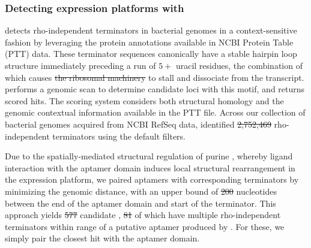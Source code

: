 \documentclass[11pt, oneside]{Thesis} %
\providecommand{\DIFadd}[1]{{\protect\color{blue}\uwave{#1}}} %
\providecommand{\DIFdel}[1]{{\protect\color{red}\sout{#1}}}                      %
\providecommand{\DIFaddbegin}{} %
\providecommand{\DIFaddend}{} %
\providecommand{\DIFdelbegin}{} %
\providecommand{\DIFdelend}{} %
\begin{document}
\subsubsection{Detecting expression platforms with \tthp}
\label{subsubsec:rfinder:tthp}

\tthp \citep{ermolaeva:2000cl} detects rho-independent terminators in bacterial
genomes in a context-sensitive fashion by leveraging the protein annotations
available in NCBI Protein Table (PTT) data. These terminator sequences canonically have a stable
hairpin loop structure immediately preceding a run of $5+$ uracil residues, the
combination of which causes \DIFdelbegin \DIFdel{the ribosomal machinery }\DIFdelend \DIFaddbegin \DIFadd{RNA polymerase }\DIFaddend to stall and dissociate from
the transcript. \tthp performs a genomic scan to determine candidate loci with
this motif, and returns scored hits. The scoring system considers both structural
homology and the genomic contextual information available in the PTT file. Across
our collection of bacterial genomes acquired from NCBI RefSeq data, \tthp
identified \DIFdelbegin \DIFdel{2,752,469 }\DIFdelend \DIFaddbegin \DIFadd{$2,752,469$ }\DIFaddend rho-independent terminators using the default filters.

Due to the spatially-mediated structural regulation of purine \rbs,
whereby ligand interaction with the aptamer domain induces local structural
rearrangement in the expression platform, we paired aptamers with corresponding
terminators by minimizing the genomic distance, with an upper bound of \DIFdelbegin \DIFdel{200
}\DIFdelend \DIFaddbegin \DIFadd{$200$
}\DIFaddend nucleotides between the end of the aptamer domain and start of the terminator.
This approach yields \DIFdelbegin \DIFdel{577 }\DIFdelend \DIFaddbegin \DIFadd{$577$ }\DIFaddend candidate \rbs, \DIFdelbegin \DIFdel{81 }\DIFdelend \DIFaddbegin \DIFadd{$81$ }\DIFaddend of which have multiple
rho-independent terminators within range of a putative aptamer produced by
\infernal. For these, we simply pair the closest \tthp hit with the aptamer domain.
\end{document}
